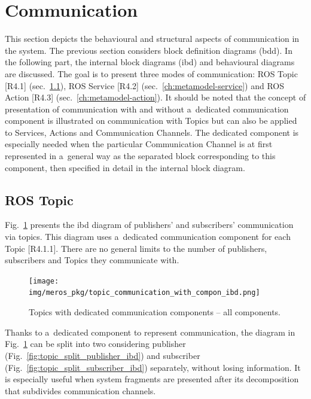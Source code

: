 \documentclass[11pt,oneside,a4paper]{report}
\begin{document}
\section{Communication}
\label{sec:metamodel-communication}
	
	This section depicts the behavioural and structural aspects of communication in the system. The previous section considers block definition diagrams (bdd). In the following part, the internal block diagrams (ibd) and behavioural diagrams are discussed. The goal is to present three modes of communication: ROS Topic [R4.1] (sec.~\ref{ch:metamodel-topic}), ROS Service [R4.2] (sec.~\ref{ch:metamodel-service}) and ROS Action [R4.3] (sec.~\ref{ch:metamodel-action}). It should be noted that the concept of presentation of communication with and without a~dedicated communication component is illustrated on communication with Topics but can also be applied to Services, Actions and Communication Channels. The dedicated component is especially needed when the particular Communication Channel is at first represented in a~general way as the separated block corresponding to this component, then specified in detail in the internal block diagram. 
	
	\subsection{ROS Topic}
	\label{ch:metamodel-topic}
		
	Fig.~\ref{fig:topic_communication_with_dedicated_component_ibd} presents the ibd diagram of publishers' and subscribers' communication via topics. This diagram uses a~dedicated communication component for each Topic [R4.1.1]. There are no general limits to the number of publishers, subscribers and Topics they communicate with. 
	

	\begin{figure}[H]
		\centering
		\begin{center}
			{\texttt{[image: img/meros\_pkg/topic\_communication\_with\_compon\_ibd.png]}}
		\end{center}
		\caption{Topics with dedicated communication components -- all components.} 
		\label{fig:topic_communication_with_dedicated_component_ibd}
	\end{figure}

	Thanks to a~dedicated component to represent communication, the diagram in Fig.~\ref{fig:topic_communication_with_dedicated_component_ibd} can be split into two considering publisher (Fig.~\ref{fig:topic_split_publisher_ibd}) and subscriber (Fig.~\ref{fig:topic_split_subscriber_ibd}) separately, without losing information. It is especially useful when system fragments are presented after its decomposition that subdivides communication channels.
	
\end{document}
